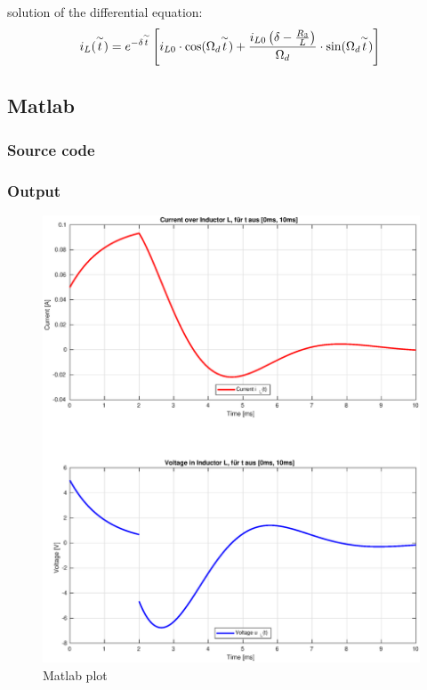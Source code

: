 \documentclass[a4paper]{article}
\begin{document}
solution of the differential equation:
\begin{equation*}
	i_L(\overset{\sim }{t}) = e^{-\delta \overset{\sim }{t}} \left[i_{L0} \cdot \cos(\Omega_d\overset{\sim }{t}) + \frac{i_{L0} \left(\delta - \frac{R_3}{L} \right)}{\Omega_d} \cdot \sin(\Omega_d\overset{\sim }{t}) \right]\\
\end{equation*}
\clearpage
\subsection{Matlab}
\subsubsection{Source code}

\subsubsection{Output}
\begin{figure}[h!]\centering
  \includegraphics[scale = 0.55]{./Figures/assignment4_plot.eps}
   \caption{Matlab plot}
   \label{fig:matlab}
\end{figure}
\clearpage
\end{document}
